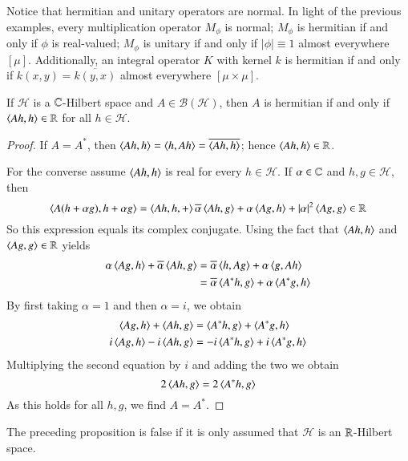 Notice that hermitian and unitary operators are normal. In light of the previous examples, every multiplication operator $M_{\phi}$ is normal; $M_{\phi}$ is hermitian if and only if $\phi$ is real-valued; $M_{\phi}$ is unitary if and only if $|\phi| \equiv 1$ almost everywhere $[\mu]$. Additionally, an integral operator $K$ with kernel $k$ is hermitian if and only if $k(x,y) = \overline{k(y,x)}$ almost everywhere $[\mu\times \mu]$.

\begin{prop}
    If $\mathscr{H}$ is a $\mathbb C$-Hilbert space and $A \in \mathscr{B}(\mathscr{H})$, then $A$ is hermitian if and only if $\left\langle Ah, h\right\rangle \in \mathbb R$ for all $h \in \mathscr{H}$.
\end{prop}
\begin{proof}
    If $A= A^*$, then $\left\langle Ah, h\right\rangle = \left\langle h, Ah\right\rangle = \overline{\left\langle Ah, h\right\rangle}$; hence $\left\langle Ah, h\right\rangle \in \mathbb R$.

    For the converse assume $\left\langle Ah, h\right\rangle$ is real for every $h \in \mathscr{H}$. If $\alpha \in \mathbb C$ and $h,g \in \mathscr{H}$, then $$\left\langle A(h+\alpha g), h+\alpha g\right\rangle = \left\langle Ah,h, +\right\rangle \overline{\alpha}\left\langle Ah, g\right\rangle + \alpha \left\langle Ag, h\right\rangle+|\alpha|^2\left\langle Ag, g\right\rangle \in \mathbb R$$
    So this expression equals its complex conjugate. Using the fact that $\left\langle Ah, h\right\rangle$ and $\left\langle Ag, g\right\rangle \in \mathbb R$ yields \begin{align*}
        \alpha \left\langle Ag, h\right\rangle+\overline{\alpha}\left\langle Ah, g\right\rangle &= \overline{\alpha}\left\langle h, Ag\right\rangle+\alpha\left\langle g, Ah\right\rangle \\
        &= \overline{\alpha}\left\langle A^*h, g\right\rangle + \alpha\left\langle A^*g, h\right\rangle
    \end{align*}
    By first taking $\alpha =1$ and then $\alpha = i$, we obtain \begin{align*}
        \left\langle Ag, h\right\rangle + \left\langle Ah, g\right\rangle &= \left\langle A^*h, g\right\rangle +\left\langle A^*g, h\right\rangle \\
        i\left\langle Ag, h\right\rangle - i\left\langle Ah, g\right\rangle &= -i\left\langle A^*h, g\right\rangle+i\left\langle A^*g, h\right\rangle
    \end{align*}
    Multiplying the second equation by $i$ and adding the two we obtain \begin{equation*}
        2\left\langle Ah, g\right\rangle = 2\left\langle A^*h, g\right\rangle
    \end{equation*}
    As this holds for all $h,g$, we find $A = A^*$.
\end{proof}

The preceding proposition is false if it is only assumed that $\mathscr{H}$ is an $\mathbb R$-Hilbert space.

